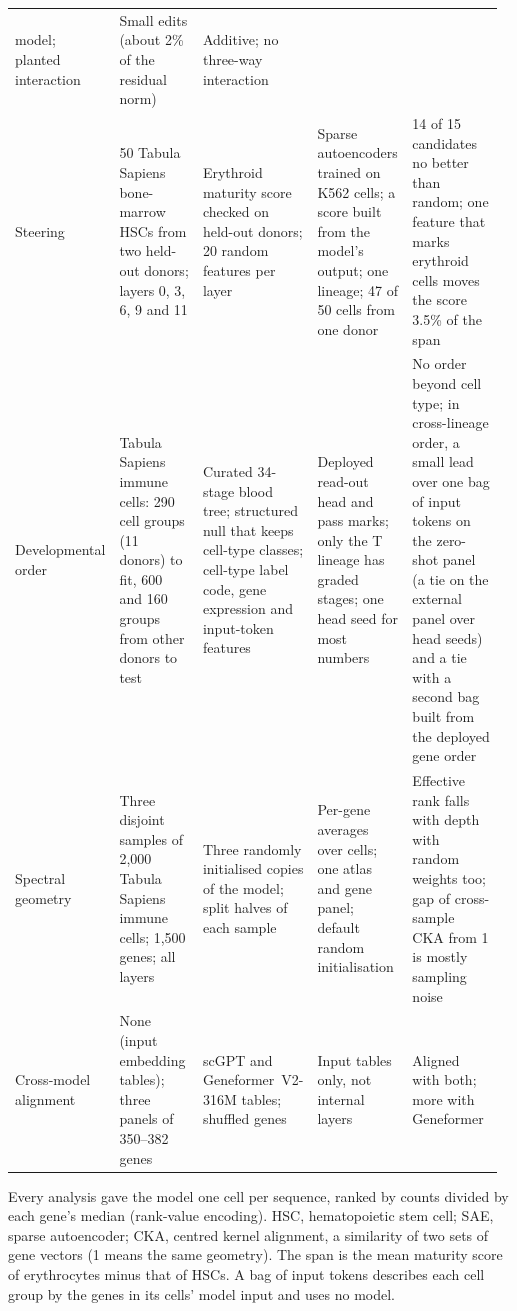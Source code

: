 \documentclass[10pt,letterpaper]{article}
\begin{document}
{\begin{longtable}{@{}p{0.15\linewidth}p{0.20\linewidth}p{0.18\linewidth}p{0.20\linewidth}p{0.24\linewidth}@{}}
model; planted interaction & Small edits (about 2\% of the residual
norm) & Additive; no three-way interaction \\
Steering & 50 Tabula Sapiens bone-marrow HSCs from two held-out donors; layers 0, 3, 6, 9 and 11 & Erythroid maturity score checked on held-out donors; 20 random features per layer & Sparse autoencoders trained on K562 cells; a score built from the model's output; one lineage; 47 of 50 cells from one donor & 14 of 15 candidates no better than random; one feature that marks erythroid cells moves the score 3.5\% of the span \\
Developmental order & Tabula Sapiens immune cells: 290 cell groups (11 donors) to fit, 600 and 160 groups from other donors to test & Curated 34-stage blood tree; structured null that keeps cell-type classes; cell-type label code, gene expression and input-token features & Deployed read-out head and pass marks; only the T lineage has graded stages; one head seed for most numbers & No order beyond cell type; in cross-lineage order, a small lead over one bag of input tokens on the zero-shot panel (a tie on the external panel over head seeds) and a tie with a second bag built from the deployed gene order \\
Spectral geometry & Three disjoint samples of 2,000 Tabula Sapiens immune cells; 1,500 genes; all layers & Three randomly initialised copies of the model; split halves of each sample & Per-gene averages over cells; one atlas and gene panel; default random initialisation & Effective rank falls with depth with random weights too; gap of cross-sample CKA from 1 is mostly sampling noise \\
Cross-model alignment & None (input embedding tables); three panels of
350--382 genes & scGPT and Geneformer~V2-316M tables; shuffled genes &
Input tables only, not internal layers & Aligned with both; more with
Geneformer \\
\end{longtable}
\begin{flushleft}
Every analysis gave
the model one cell per sequence, ranked by counts divided by each gene's
median (rank-value encoding). HSC, hematopoietic stem cell; SAE, sparse
autoencoder; CKA, centred kernel alignment, a similarity of two sets of
gene vectors (1 means the same geometry). The span is the mean maturity
score of erythrocytes minus that of HSCs. A bag of input tokens describes
each cell group by the genes in its cells' model input and uses no model.
\end{flushleft}
}
\end{document}
